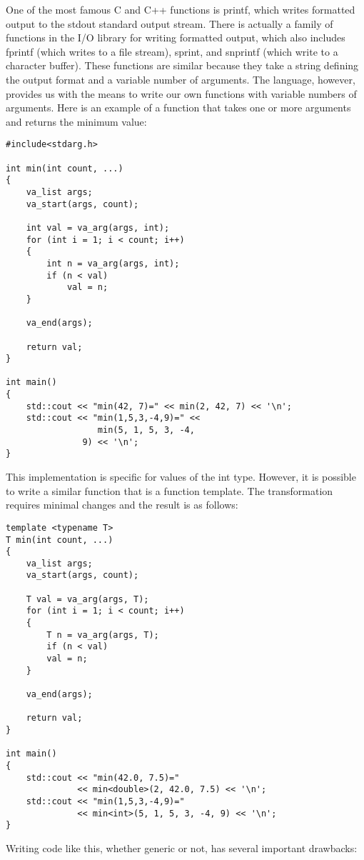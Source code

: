 One of the most famous C and C++ functions is printf, which writes formatted output to the stdout standard output stream. There is actually a family of functions in the I/O library for writing formatted output, which also includes fprintf (which writes to a file stream), sprint, and snprintf (which write to a character buffer). These functions are similar because they take a string defining the output format and a variable number of arguments. The language, however, provides us with the means to write our own functions with variable numbers of arguments. Here is an example of a function that takes one or more arguments and returns the minimum value:

\begin{lstlisting}[style=styleCXX]
#include<stdarg.h>

int min(int count, ...)
{
	va_list args;
	va_start(args, count);
	
	int val = va_arg(args, int);
	for (int i = 1; i < count; i++)
	{
		int n = va_arg(args, int);
		if (n < val)
			val = n;
	}

	va_end(args);
	
	return val;
}

int main()
{
	std::cout << "min(42, 7)=" << min(2, 42, 7) << '\n';
	std::cout << "min(1,5,3,-4,9)=" <<
				  min(5, 1, 5, 3, -4,
	           9) << '\n';
}
\end{lstlisting}

This implementation is specific for values of the int type. However, it is possible to write a similar function that is a function template. The transformation requires minimal changes and the result is as follows:

\begin{lstlisting}[style=styleCXX]
template <typename T>
T min(int count, ...)
{
	va_list args;
	va_start(args, count);
	
	T val = va_arg(args, T);
	for (int i = 1; i < count; i++)
	{
		T n = va_arg(args, T);
		if (n < val)
		val = n;
	}

	va_end(args);
	
	return val;
}

int main()
{
	std::cout << "min(42.0, 7.5)="
		      << min<double>(2, 42.0, 7.5) << '\n';
	std::cout << "min(1,5,3,-4,9)="
  	          << min<int>(5, 1, 5, 3, -4, 9) << '\n';
}
\end{lstlisting}

Writing code like this, whether generic or not, has several important drawbacks:

